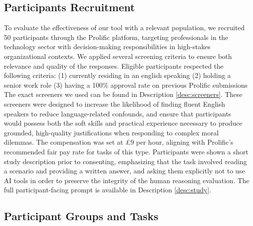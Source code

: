 \subsection{Participants Recruitment}

To evaluate the effectiveness of our tool with a relevant population, we recruited 50 participants through the Prolific platform, targeting professionals in the technology sector with decision-making responsibilities in high-stakes organizational contexts.
We applied several screening criteria to ensure both relevance and quality of the responses. Eligible participants respected the following criteria:
(1) currently residing in an english speaking
(2) holding a senior work role
(3) having a 100\% approval rate on previous Prolific submissions
The exact screeners we used can be found in Description \ref{desc:screeners}.
These screeners were designed to increase the likelihood of finding fluent English speakers to reduce language-related confounds, and ensure that participants would possess both the soft skills and practical experience necessary to produce grounded, high-quality justifications when responding to complex moral dilemmas.
The compensation was set at £9 per hour, aligning with Prolific's recommended fair pay rate for tasks of this type.
Participants were shown a short study description prior to consenting, emphasizing that the task involved reading a scenario and providing a written answer, and asking them explicitly not to use AI tools in order to preserve the integrity of the human reasoning evaluation. The full participant-facing prompt is available in Description \ref{desc:study}.

\subsection{Participant Groups and Tasks}

